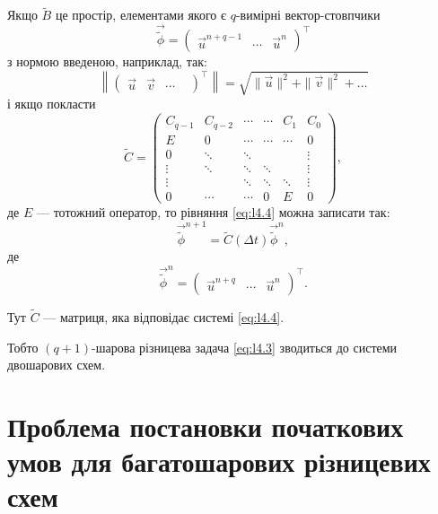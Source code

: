 Якщо $\tilde B$ це простір, елементами якого є $q$-вимірні вектор-стовпчики
\begin{equation*}
    \vec{\tilde{\phi}} = \begin{pmatrix} \vec u^{n + q - 1} & \cdots & \vec u^n \end{pmatrix}^\intercal
\end{equation*}
з нормою введеною, наприклад, так:
\begin{equation*}
    \left\| \begin{pmatrix} \vec u & \vec v & \cdots & \end{pmatrix}^\intercal \right\| = \sqrt{\|\vec u\|^2 + \|\vec v\|^2 + \ldots}
\end{equation*}
і якщо покласти
\begin{equation*}
    \tilde C = \begin{pmatrix}
        C_{q - 1} & C_{q - 2} & \cdots & \cdots & C_1 & C_0 \\
        E & 0 & \cdots & \cdots & \cdots & 0 \\
        0 & \ddots & \ddots & & & \vdots \\
        \vdots & \ddots & \ddots & \ddots & & \vdots \\
        \vdots & & \ddots & \ddots & \ddots & \vdots \\
        0 & \cdots & \cdots & 0 & E & 0
    \end{pmatrix},
\end{equation*}
де $E$ --- тотожний оператор, то рівняння \eqref{eq:l4.4} можна записати так:
\begin{equation}
    \label{eq:l4.5}
    \vec{\tilde{\phi}}^{n + 1} = \tilde C(\Delta t) \vec{\tilde{\phi}}^n,
\end{equation}
де 
\begin{equation}
    \vec{\tilde{\phi}}^n = \begin{pmatrix} \vec u^{n + q} & \cdots & \vec u^n \end{pmatrix}^\intercal.
\end{equation}

Тут $\tilde C$ --- матриця, яка відповідає системі \eqref{eq:l4.4}. \medskip

Тобто $(q + 1)$-шарова різницева задача \eqref{eq:l4.3} зводиться до системи двошарових схем.

\section{Проблема постановки початкових умов для багатошарових різницевих схем}

